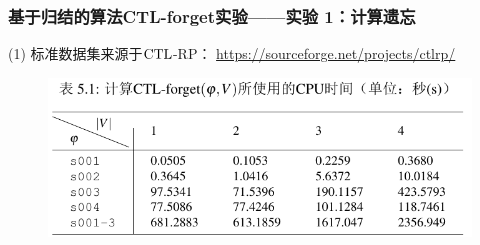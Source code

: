 \documentclass[9pt, CJK]{beamer}
\begin{document}
	\begin{frame}
		\frametitle{基于归结的算法CTL-forget实验——{\footnotesize 实验 1：计算遗忘}}
		{\footnotesize
			(1)	标准数据集来源于$\textrm{CTL}$-RP： \url{https://sourceforge.net/projects/ctlrp/}
			\begin{figure}
				\includegraphics[scale=0.35]{figures/expTab}
			\end{figure}
			
}
\end{frame}
\end{document}
